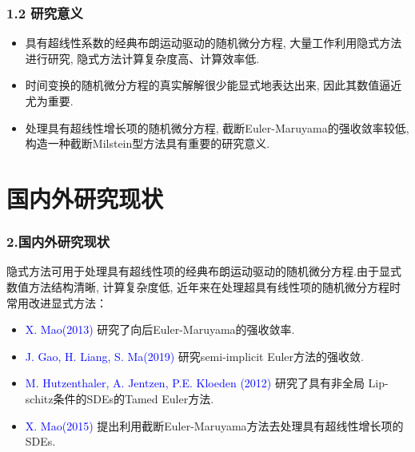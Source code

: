 \documentclass[notheorems,10pt,compress]{beamer}
\numberwithin{figure}{section}
\numberwithin{table}{section}
\numberwithin{equation}{section}
\numberwithin{theorem}{section}
\numberwithin{definition}{section}
\numberwithin{lemma}{section}
\numberwithin{proposition}{section}
\numberwithin{corollary}{section}
\theoremstyle{example}
\newcommand{\blue}[1]{\textcolor{blue}{#1}}
\begin{document}
\begin{frame}		
\frametitle{ 1.2 研究意义}

            \begin{itemize}
           \setlength{\itemsep}{10pt}
            \item  具有超线性系数的经典布朗运动驱动的随机微分方程, 大量工作利用隐式方法进行研究, 隐式方法计算复杂度高、计算效率低.
             \item 时间变换的随机微分方程的真实解解很少能显式地表达出来, 因此其数值逼近尤为重要.
            \item 处理具有超线性增长项的随机微分方程, 截断Euler-Maruyama的强收敛率较低, 构造一种截断Milstein型方法具有重要的研究意义.   
           

       \end{itemize}
\end{frame}


	\section{国内外研究现状}

\begin{frame}
    \frametitle{2.国内外研究现状\\}
\vskip 10pt
\setlength{\parindent}{2em} 隐式方法可用于处理具有超线性项的经典布朗运动驱动的随机微分方程.由于显式数值方法结构清晰, 计算复杂度低, 近年来在处理超具有线性项的随机微分方程时常用改进显式方法：
    \begin{itemize}
        \setlength{\itemsep}{10pt}
        \item \blue{ X. Mao(2013) } 研究了向后Euler-Maruyama的强收敛率. 
        \item \blue{J. Gao, H. Liang, S. Ma(2019)} 研究semi-implicit Euler方法的强收敛.
\item \blue{M. Hutzenthaler, A. Jentzen, P.E. Kloeden (2012) } 研究了具有非全局
Lip-\\
schitz条件的SDEs的Tamed Euler方法.
\item \blue{ X. Mao(2015) } 提出利用截断Euler-Maruyama方法去处理具有超线性增长项的SDEs.           
    \end{itemize}
\end{frame}
		
\end{document}
